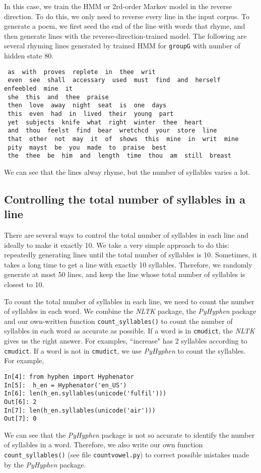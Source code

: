 In this case, we train the HMM or 2rd-order Markov model in the reverse direction. To do this, we only need to reverse every line in the input corpus. To generate a poem, we first seed the end of the line with words that rhyme, and then generate lines with the reverse-direction-trained model. The following are several rhyming lines generated by trained HMM for \texttt{groupG} with number of hidden state 80.
\begin{lstlisting}
 as  with  proves  replete  in  thee  writ 
 even  see  shall  accessary  used  must  find  and  herself  enfeebled  mine  it 
 she  this  and  thee  praise 
 then  love  away  night  seat  is  one  days 
 this  even  had  in  lived  their  young  part 
 yet  subjects  knife  what  right  winter  thee  heart 
 and  thou  feelst  find  bear  wretchcd  your  store  line 
 that  other  not  may  it  of  shows  this  mine  in  writ  mine 
 pity  mayst  be  you  made  to  praise  best 
 the  thee  be  him  and  length  time  thou  am  still  breast 
\end{lstlisting}
We can see that the lines alway rhyme, but the number of syllables varies a lot.

\subsection{Controlling the total number of syllables in a line}
There are several ways to control the total number of syllables in each line and ideally to make it exactly 10. We take a very simple approach to do this: repeatedly generating lines until the total number of syllables is 10. Sometimes, it takes a long time to get a line with exactly 10 syllables. Therefore, we randomly generate at most 50 lines, and keep the line whose total number of syllables is closest to 10.

To count the total number of syllables in each line, we need to count the number of syllables in each word. We combine the \textit{NLTK} package, the \textit{PyHyphen} package and our own-written function \texttt{count\_syllables()} to count the number of syllables in each word as accurate as possible. If a word is in \texttt{cmudict}, the \textit{NLTK} gives us the right answer. For examples, ``increase" has 2 syllables according to \texttt{cmudict}. If a word is not in \texttt{cmudict}, we use \textit{PyHyphen} to count the syllables. For example,
\begin{lstlisting}
In[4]: from hyphen import Hyphenator
In[5]:  h_en = Hyphenator('en_US')
In[6]: len(h_en.syllables(unicode('fulfil')))
Out[6]: 2
In[7]: len(h_en.syllables(unicode('air')))
Out[7]: 0
\end{lstlisting}
We can see that the \textit{PyHyphen} package is not so accurate to identify the number of syllables in a word. Therefore, we also write our own function \texttt{count\_syllables()} (see file \texttt{countvowel.py}) to correct possible mistakes made by the \textit{PyHyphen} package.

